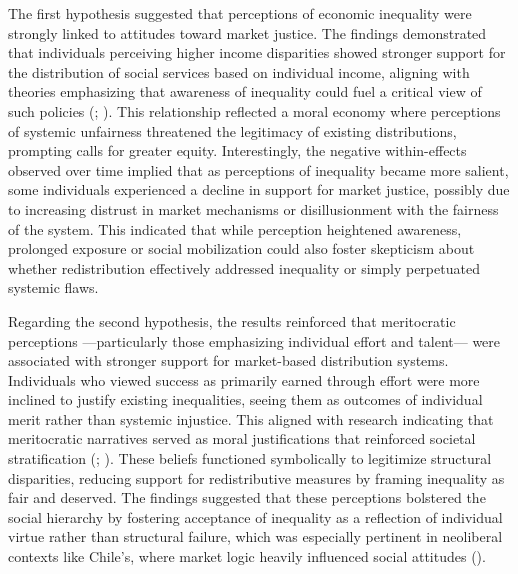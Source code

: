 \documentclass[
  12pt,
]{article}
\begin{document}
The first hypothesis suggested that perceptions of economic inequality
were strongly linked to attitudes toward market justice. The findings
demonstrated that individuals perceiving higher income disparities
showed stronger support for the distribution of social services based on
individual income, aligning with theories emphasizing that awareness of
inequality could fuel a critical view of such policies
(;
). This relationship
reflected a moral economy where perceptions of systemic unfairness
threatened the legitimacy of existing distributions, prompting calls for
greater equity. Interestingly, the negative within-effects observed over
time implied that as perceptions of inequality became more salient, some
individuals experienced a decline in support for market justice,
possibly due to increasing distrust in market mechanisms or
disillusionment with the fairness of the system. This indicated that
while perception heightened awareness, prolonged exposure or social
mobilization could also foster skepticism about whether redistribution
effectively addressed inequality or simply perpetuated systemic flaws.

Regarding the second hypothesis, the results reinforced that
meritocratic perceptions ---particularly those emphasizing individual
effort and talent--- were associated with stronger support for
market-based distribution systems. Individuals who viewed success as
primarily earned through effort were more inclined to justify existing
inequalities, seeing them as outcomes of individual merit rather than
systemic injustice. This aligned with research indicating that
meritocratic narratives served as moral justifications that reinforced
societal stratification (; ). These
beliefs functioned symbolically to legitimize structural disparities,
reducing support for redistributive measures by framing inequality as
fair and deserved. The findings suggested that these perceptions
bolstered the social hierarchy by fostering acceptance of inequality as
a reflection of individual virtue rather than structural failure, which
was especially pertinent in neoliberal contexts like Chile's, where
market logic heavily influenced social attitudes
().
\end{document}
